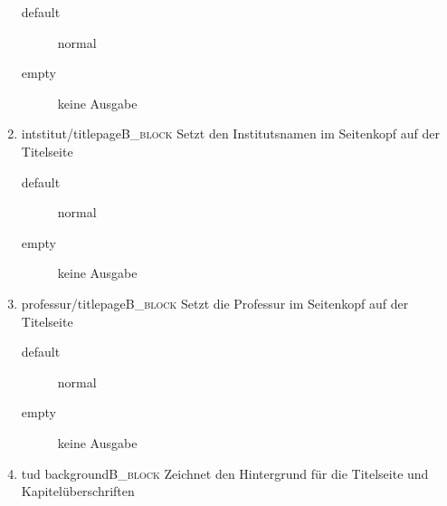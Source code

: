 \documentclass[presentation,t]{beamer}
\begin{document}
\begin{enumerate}
\begin{description}
\item[{default}] normal
\item[{empty}] keine Ausgabe
\end{description}
\item intstitut/titlepage\hfill{}\textsc{B\_block}
\label{sec:orge6931ed}
Setzt den Institutsnamen im Seitenkopf auf der Titelseite

\begin{description}
\item[{default}] normal
\item[{empty}] keine Ausgabe
\end{description}

\item professur/titlepage\hfill{}\textsc{B\_block}
\label{sec:org6771e6b}
Setzt die Professur im Seitenkopf auf der Titelseite

\begin{description}
\item[{default}] normal
\item[{empty}] keine Ausgabe
\end{description}

\item tud background\hfill{}\textsc{B\_block}
\label{sec:org045352c}
Zeichnet den Hintergrund für die Titelseite und Kapitelüberschriften


\end{enumerate}
\end{document}
